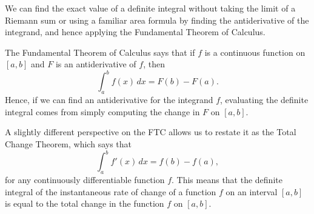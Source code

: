 \begin{summary}
\item We can find the exact value of a definite integral without taking the limit of a Riemann sum or using a familiar area formula by finding the antiderivative of the integrand, and hence applying the Fundamental Theorem of Calculus.
\item The Fundamental Theorem of Calculus says that if $f$ is a continuous function on $[a,b]$ and $F$ is an antiderivative of $f$, then
$$\int_a^b f(x) \, dx = F(b) - F(a).$$
Hence, if we can find an antiderivative for the integrand $f$, evaluating the definite integral comes from simply computing the change in $F$ on $[a,b]$. 
\item A slightly different perspective on the FTC allows us to restate it as the Total Change Theorem, which says that
$$\int_a^b f'(x) \, dx = f(b) - f(a),$$
for any continuously differentiable function $f$.   This means that the definite integral of the instantaneous rate of change of a function $f$ on an interval $[a,b]$ is equal to the total change in the function $f$ on $[a,b]$.
\end{summary}

\nin \hrulefill

 

\clearpage

